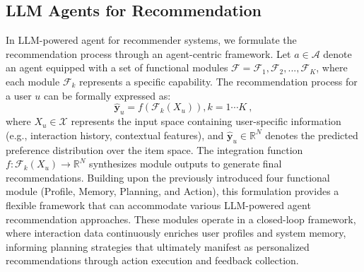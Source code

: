 \subsection{LLM Agents for Recommendation}


In LLM-powered agent for recommender systems, we formulate the recommendation process through an agent-centric framework. 
Let $a \in \mathcal{A}$ denote an agent equipped with a set of functional modules $\mathcal{F} = {\mathcal{F}_1, \mathcal{F}_2, ..., \mathcal{F}_K}$, where each module $\mathcal{F}_k$ represents a specific capability. 
The recommendation process for a user $u$ can be formally expressed as:
\begin{equation}
\hat{\mathbf{y}}_u = f({\mathcal{F}_k(X_u)}), k=1 \cdots K \ ,
\end{equation}
where $X_u \in \mathcal{X}$ represents the input space containing user-specific information (e.g., interaction history, contextual features), and $\hat{\mathbf{y}}_u \in \mathbb{R}^N$ denotes the predicted preference distribution over the item space. 
The integration function $f: {\mathcal{F}_k(X_u)} \rightarrow \mathbb{R}^N$ synthesizes module outputs to generate final recommendations.
Building upon the previously introduced four functional module (Profile, Memory, Planning, and Action), this formulation provides a flexible framework that can accommodate various LLM-powered agent recommendation approaches. 
These modules operate in a closed-loop framework, where interaction data continuously enriches user profiles and system memory, informing planning strategies that ultimately manifest as personalized recommendations through action execution and feedback collection.